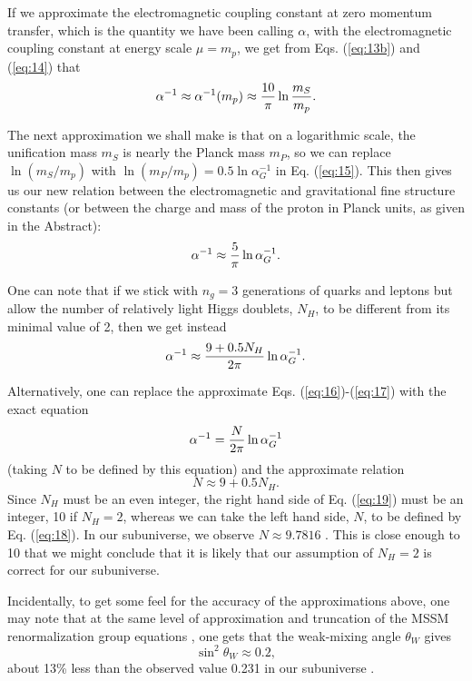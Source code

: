 \documentclass[a4paper,12pt]{article}
\begin{document}
	If we approximate the electromagnetic coupling constant
at zero momentum transfer,
which is the quantity we have been calling $\alpha$,
with the electromagnetic coupling constant at energy scale
$\mu = m_p$, we get from Eqs. (\ref{eq:13b}) and (\ref{eq:14}) that
 \begin{equation}
 \alpha^{-1} \approx \alpha^{-1}(m_p)
             \approx {10\over\pi}\ln{m_S\over m_p}.
 \label{eq:15}
 \end{equation}
 
 	The next approximation we shall make is that on a logarithmic
scale, the unification mass $m_S$ is nearly the Planck mass $m_P$,
so we can replace $\ln{(m_S/m_p)}$ with
$\ln{(m_P/m_p)} = 0.5\ln{\alpha_G^{-1}}$ in Eq. (\ref{eq:15}).
This then gives us our new relation between
the electromagnetic and gravitational fine structure constants
(or between the charge and mass of the proton in Planck units,
as given in the Abstract):
 \begin{equation}
 \alpha^{-1} \approx {5\over\pi}\ln{\alpha_G^{-1}}.
 \label{eq:16}
 \end{equation}
 
 	One can note that if we stick with $n_g = 3$ generations
of quarks and leptons but allow the number
of relatively light Higgs doublets, $N_H$, to be different from
its minimal value of 2, then we get instead
 \begin{equation}
 \alpha^{-1} \approx {9+0.5N_H\over 2\pi}\ln{\alpha_G^{-1}}.
 \label{eq:17}
 \end{equation}

	Alternatively, one can replace the approximate
Eqs. (\ref{eq:16})-(\ref{eq:17}) with the exact equation
 \begin{equation}
 \alpha^{-1} = {N\over 2\pi}\ln{\alpha_G^{-1}}
 \label{eq:18}
 \end{equation}
(taking $N$ to be defined by this equation)
and the approximate relation
 \begin{equation}
 N \approx 9 + 0.5N_H.
 \label{eq:19}
 \end{equation}
Since $N_H$ must be an even integer, the right hand side
of Eq. (\ref{eq:19}) must be an integer, 10 if $N_H = 2$,
whereas we can take the left hand side, $N$,
to be defined by Eq. (\ref{eq:18}).
In our subuniverse, we observe $N \approx 9.7816$ \cite{PDG}.
This is close enough to 10 that we might conclude
that it is likely that our assumption of $N_H = 2$ is correct
for our subuniverse.

	Incidentally, to get some feel for the accuracy
of the approximations above, one may note that at the same
level of approximation and truncation of the MSSM
renormalization group equations \cite{MarCen},
one gets that the weak-mixing angle $\theta_W$ gives
 \begin{equation}
 \sin^2\theta_W \approx 0.2,
 \label{eq:20}
 \end{equation}
about 13\% less than the observed value 0.231 in our subuniverse
\cite{PDG}.
\end{document}
